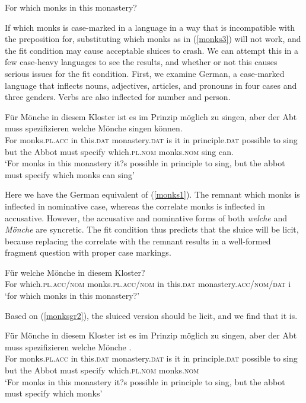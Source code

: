 \documentclass{turabian-researchpaper}
\begin{document}
\begin{exe}
\ex\label{monks3}
For which monks in this monastery? 
\end{exe}

If which monks is case-marked in a language in a way that is incompatible with the preposition for, substituting which monks as in (\ref{monks3}) will not work, and the fit condition may cause acceptable sluices to crash. We can attempt this in a few case-heavy languages to see the results, and whether or not this causes serious issues for the fit condition. First, we examine German, a case-marked language that inflects nouns, adjectives, articles, and pronouns in four cases and three genders. Verbs are also inflected for number and person. 

\begin{exe}
\ex\label{monksgr1}
\gll F\"ur M\"onche in diesem Kloster ist es im Prinzip m\"oglich  zu singen, aber der Abt muss spezifizieren welche M\"onche singen k\"onnen. \\
For monks.\textsc{pl.acc} in this.\textsc{dat} monastery.\textsc{dat} is it in principle.\textsc{dat} possible to  sing but the Abbot must  specify which.\textsc{pl.nom} monks.\textsc{nom} sing can. \\
\trans `For monks in this monastery it?s possible in principle to sing, but the abbot must specify 
which monks can sing'
\end{exe}

Here we have the German equivalent of (\ref{monks1}). The remnant which monks is inflected in nominative case, whereas the correlate monks is inflected in accusative. However, the accusative and nominative forms of both \textit{welche} and \textit{M\"onche} are syncretic. The fit condition thus predicts that the sluice will be licit, because replacing the correlate with the remnant results in a well-formed fragment question with proper case markings. 

\begin{exe}
\ex\label{monksgr2}
\gll F\"ur welche M\"onche in diesem Kloster? \\
For which.\textsc{pl.acc/nom} monks.\textsc{pl.acc/nom} in this.\textsc{dat} monastery.\textsc{acc/nom/dat} i\\
\trans `for which monks in this monastery?'
\end{exe}

Based on (\ref{monksgr2}), the sluiced version should be licit, and we find that it is. 

\begin{exe}
\ex\label{monksgr3}
\gll F\"ur M\"onche in diesem Kloster ist es im Prinzip m\"oglich  zu singen, aber der Abt muss spezifizieren welche M\"onche . \\
For monks.\textsc{pl.acc} in this.\textsc{dat} monastery.\textsc{dat} is it in principle.\textsc{dat} possible to  sing but the Abbot must  specify which.\textsc{pl.nom} monks.\textsc{nom} \\
\trans `For monks in this monastery it?s possible in principle to sing, but the abbot must specify 
which monks'
\end{exe}
\end{document}
